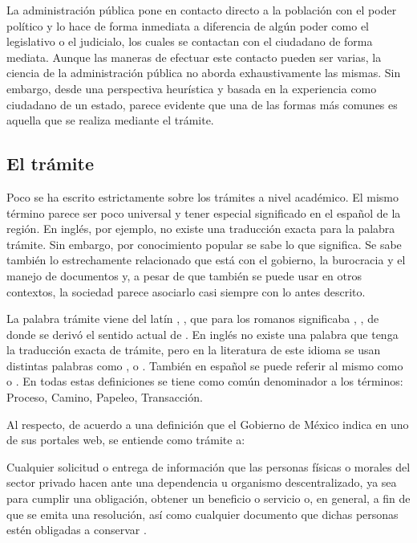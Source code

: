 La administración pública pone en contacto directo a la población con el poder político \cite{mostajomachicadoDerechoAdministrativoAdministracion2016} 
y lo hace de forma inmediata a diferencia de algún poder como el legislativo o el judicialo, los cuales se contactan con el ciudadano de forma mediata. 
Aunque las maneras de efectuar este contacto pueden ser varias, la ciencia de la administración pública no aborda exhaustivamente las mismas. 
Sin embargo, desde una perspectiva heurística y basada en la experiencia como ciudadano de un estado, parece evidente que una de las formas más comunes es aquella que se realiza mediante el trámite.

\subsection{El trámite}

Poco se ha escrito estrictamente sobre los trámites a nivel académico. 
El mismo término parece ser poco universal y tener especial significado en el español de la región. 
En inglés, por ejemplo, no existe una traducción exacta para la palabra trámite. 
Sin embargo, por conocimiento popular se sabe lo que significa. 
Se sabe también lo estrechamente relacionado que está con el gobierno, la burocracia y el manejo de documentos y, 
a pesar de que también se puede usar en otros contextos, la sociedad parece asociarlo casi siempre con lo antes descrito.

La palabra trámite viene del latín , , que para los romanos significaba , , de donde se derivó el sentido actual de \cite{TramiteCastellanoPagina}. 
En inglés no existe una palabra que tenga la traducción exacta de trámite, pero en la literatura de este idioma se usan distintas palabras como ,  o . 
También en español se puede referir al mismo como  o . 
En todas estas definiciones se tiene como común denominador a los términos: Proceso, Camino, Papeleo, Transacción.

Al respecto, de acuerdo a una definición que el Gobierno de México indica en uno de sus portales web, se entiende como trámite a:

\begin{displayquote} 
    Cualquier solicitud o entrega de información que las personas físicas o morales del sector privado hacen ante una dependencia u organismo descentralizado, 
    ya sea para cumplir una obligación, obtener un beneficio o servicio o, en general, a fin de que se emita una resolución, así como cualquier documento que dichas personas estén obligadas a conservar \cite{epnQueEsTramite}.
\end{displayquote}

